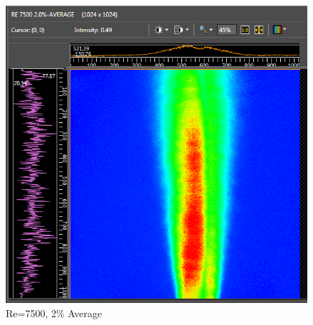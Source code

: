 \documentclass[preview,12pt]{article}
\begin{document}
\begin{figure}[h]
    \centering
    \includegraphics[width=0.55\linewidth]{RE-7500-20-Avg.PNG}
    \caption{{\footnotesize Re=7500, 2\% Average}}
\end{figure}
\end{document}
